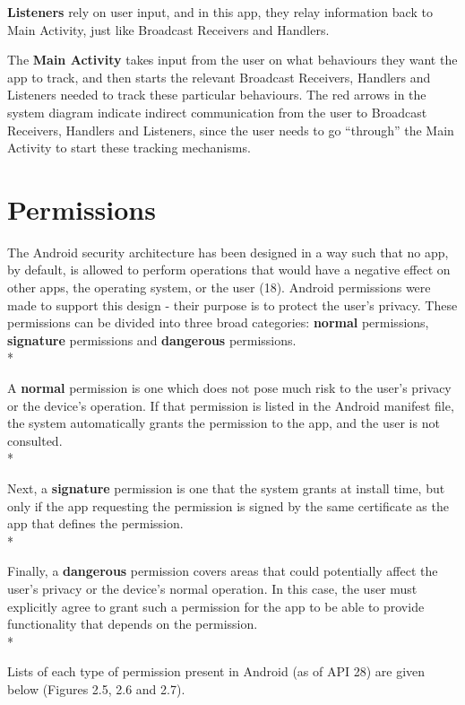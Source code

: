 \documentclass[12pt,twoside]{report}
\begin{document}
\textbf{Listeners} rely on user input, and in this app, they relay information back to Main Activity, just like Broadcast Receivers and Handlers.

The \textbf{Main Activity} takes input from the user on what behaviours they want the app to track, and then starts the relevant Broadcast Receivers, Handlers and Listeners needed to track these particular behaviours. The red arrows in the system diagram indicate indirect communication from the user to Broadcast Receivers, Handlers and Listeners, since the user needs to go “through” the Main Activity to start these tracking mechanisms.


\section{Permissions}
The Android security architecture has been designed in a way such that no app, by default, is allowed to perform operations that would have a negative effect on other apps, the operating system, or the user (18). Android permissions were made to support this design - their purpose is to protect the user’s privacy. These permissions can be divided into three broad categories: \textbf{normal} permissions, \textbf{signature} permissions and \textbf{dangerous} permissions. \\*

A \textbf{normal} permission is one which does not pose much risk to the user’s privacy or the device’s operation. If that permission is listed in the Android manifest file, the system automatically grants the permission to the app, and the user is not consulted.\\*

Next, a \textbf{signature} permission is one that the system grants at install time, but only if the app requesting the permission is signed by the same certificate as the app that defines the permission.\\*

Finally, a \textbf{dangerous} permission covers areas that could potentially affect the user’s privacy or the device’s normal operation. In this case, the user must explicitly agree to grant such a permission for the app to be able to provide functionality that depends on the permission.\\*

Lists of each type of permission present in Android (as of API 28) are given below (Figures 2.5, 2.6 and 2.7).
\end{document}
